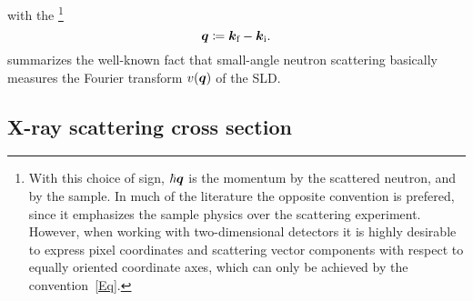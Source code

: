 %
with the \footnote
{With this choice of sign,
%
$\hbar\bm{q}$ is the momentum
%
 by the scattered neutron,
and  by the sample.
In much of the literature the opposite convention is prefered,
since it emphasizes the sample physics over the scattering experiment.
However, when working with two-dimensional detectors
it is highly desirable to express pixel coordinates
and scattering vector components
with respect to equally oriented coordinate axes,
which can only be achieved by the convention~\cref{Eq}.}
%
\begin{equation}\label{Eq}
  \bm{q}\coloneqq {\bm{k}}_{\text{f}}-{\bm{k}}_{\text{i}}.
\end{equation}
%
 summarizes the well-known fact that
small-angle neutron scattering basically measures
the Fourier transform $v(\bm{q})$ of the SLD.
%
%

\subsection{X-ray scattering cross section}%

\def\Ei{\v{E}_\si}
\def\Eic{\Ei^*}
\def\Ef{\v{E}_\sf}
\def\Efc{\Ef^*}
\def\Eo{\v{E}_0}%
\def\Efo{\v{E}_{0\sf}}%
\def\Efoc{\v{E}^*_{0\sf}}%
\def\he{\v{\hat e}}
\def\hef{\he_\sf}
\def\hei{\he_\si}
\def\sif{\text{i,f}}

